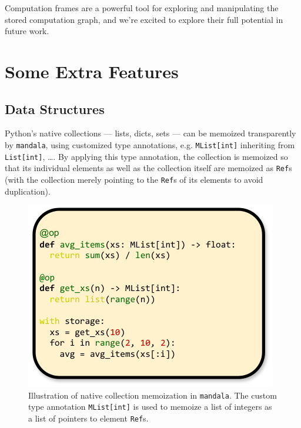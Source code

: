 \documentclass{article} %
\begin{document}
Computation frames are a powerful tool for exploring and manipulating the stored
computation graph, and we're excited to explore their full potential in future
work.

\section{Some Extra Features}
\label{section:extra-features}

\subsection{Data Structures}
\label{subsection:data-structures}

Python's native collections --- lists, dicts, sets --- can be memoized
transparently by \texttt{mandala}, using customized type annotations, e.g.
\texttt{MList[int]} inheriting from \texttt{List[int]}, \ldots. By applying this
type annotation, the collection is memoized so that its individual elements as
well as the collection itself are memoized as \texttt{Ref}s (with the collection
merely pointing to the \texttt{Ref}s of its elements to avoid duplication). 

\begin{figure}
    \centering
    \includegraphics[width=\linewidth]{img/list.pdf}
    \caption{Illustration of native collection memoization in \texttt{mandala}.
    The custom type annotation \texttt{MList[int]} is used to memoize a list of
    integers as a list of pointers to element \texttt{Ref}s.}
    \label{fig:list}
\end{figure}
\end{document}
